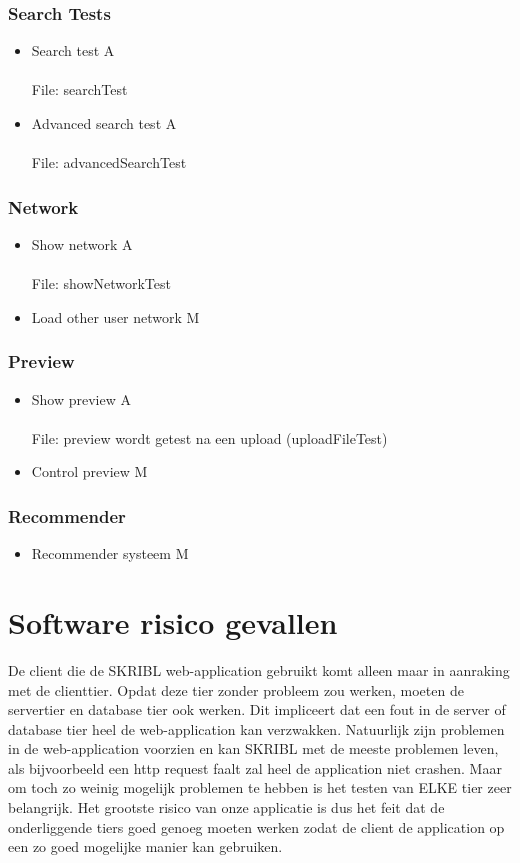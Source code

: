\documentclass{article}
\begin{document}
\subsubsection{Search Tests}
\begin{itemize}
\item Search test A\\\\
File: searchTest
\item Advanced search test A\\\\
File: advancedSearchTest
\end{itemize}
\subsubsection{Network}
\begin{itemize}
\item Show network A\\\\
File: showNetworkTest
\item Load other user network M
\end{itemize}
\subsubsection{Preview}
\begin{itemize}
\item Show preview A\\\\
File: preview wordt getest na een upload (uploadFileTest)
\item Control preview M
\end{itemize}
\subsubsection{Recommender}
\begin{itemize}
\item Recommender systeem M
\end{itemize}
\section{Software risico gevallen}
De client die de SKRIBL web-application gebruikt komt alleen maar in aanraking met de clienttier. Opdat deze tier zonder probleem zou werken, moeten de servertier en database tier ook werken. Dit impliceert dat een fout in de server of database tier heel de web-application kan verzwakken. Natuurlijk zijn problemen in de web-application voorzien en kan SKRIBL met de meeste problemen leven, als bijvoorbeeld een http request faalt zal heel de application niet crashen. Maar om toch zo weinig mogelijk problemen te hebben is het testen  van ELKE tier zeer belangrijk. Het grootste risico van onze applicatie is dus het feit dat de onderliggende tiers goed genoeg moeten werken zodat de client de application op een zo goed mogelijke manier kan gebruiken.
%
\end{document}
